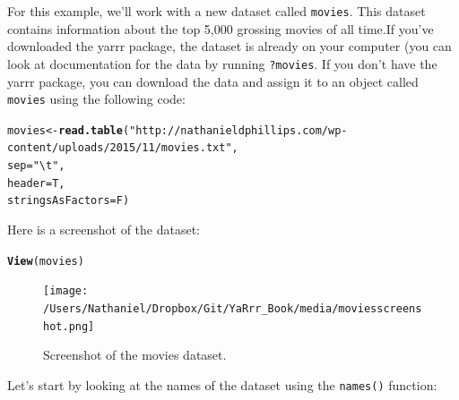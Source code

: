 \documentclass{tufte-book}\usepackage[]{graphicx}\usepackage[]{color}
\makeatletter
\newcommand{\hlstr}[1]{\textcolor[rgb]{0.192,0.494,0.8}{#1}}%
\newcommand{\hlstd}[1]{\textcolor[rgb]{0.345,0.345,0.345}{#1}}%
\newcommand{\hlkwb}[1]{\textcolor[rgb]{0.69,0.353,0.396}{#1}}%
\newcommand{\hlkwc}[1]{\textcolor[rgb]{0.333,0.667,0.333}{#1}}%
\newcommand{\hlkwd}[1]{\textcolor[rgb]{0.737,0.353,0.396}{\textbf{#1}}}%
\newenvironment{kframe}{%
 \def\at@end@of@kframe{}%
 \ifinner\ifhmode%
  \def\at@end@of@kframe{\end{minipage}}%
  \begin{minipage}{\columnwidth}%
 \fi\fi%
 \def\FrameCommand##1{\hskip\@totalleftmargin \hskip-\fboxsep
 \colorbox{shadecolor}{##1}\hskip-\fboxsep
     \hskip-\linewidth \hskip-\@totalleftmargin \hskip\columnwidth}%
 \MakeFramed {\advance\hsize-\width
   \@totalleftmargin\z@ \linewidth\hsize
   \@setminipage}}%
 {\par\unskip\endMakeFramed%
 \at@end@of@kframe}
\newenvironment{knitrout}{}{} %
\makeatother
\begin{document}
For this example, we'll work with a new dataset called \texttt{movies}. This dataset contains information about the top 5,000 grossing movies of all time.If you've downloaded the yarrr package, the dataset is already on your computer (you can look at documentation for the data by running \texttt{?movies}. If you don't have the yarrr package, you can download the data and assign it to an object called \texttt{movies} using the following code:

\begin{knitrout}
\color{fgcolor}\begin{kframe}
\begin{alltt}
\hlstd{movies} \hlkwb{<-} \hlkwd{read.table}\hlstd{(}\hlstr{"http://nathanieldphillips.com/wp-content/uploads/2015/11/movies.txt"}\hlstd{,}
                     \hlkwc{sep} \hlstd{=} \hlstr{"\textbackslash{}t"}\hlstd{,}
                     \hlkwc{header} \hlstd{= T,}
                     \hlkwc{stringsAsFactors} \hlstd{= F)}
\end{alltt}
\end{kframe}
\end{knitrout}



Here is a screenshot of the dataset:

\begin{footnotesize}
\begin{knitrout}
\color{fgcolor}\begin{kframe}
\begin{alltt}
\hlkwd{View}\hlstd{(movies)}
\end{alltt}
\end{kframe}
\end{knitrout}
\end{footnotesize}

\begin{figure}
\texttt{[image: /Users/Nathaniel/Dropbox/Git/YaRrr\_Book/media/moviesscreenshot.png]}
\caption{Screenshot of the movies dataset.}
\label{fig:moviesscreen}
\end{figure}

Let's start by looking at the names of the dataset using the \texttt{names()} function:
\end{document}
